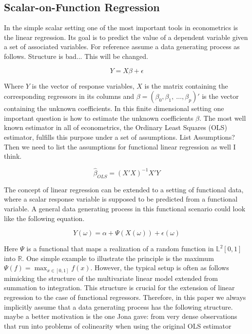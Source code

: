 \documentclass[11pt,twoside,a4paper]{article}
\begin{document}
	\subsection{Scalar-on-Function Regression}
	In the simple scalar setting one of the most important tools in econometrics is the linear regression. Its goal is to predict the value of a dependent variable given a set of associated variables. For reference assume a data generating process as follows. {\color{red} Structure is bad... This will be changed.}
	
	\begin{equation}
		Y = X\beta + \epsilon
	\end{equation}
	
	Where $Y$ is the vector of response variables, $X$ is the matrix containing the corresponding regressors in its columns and $\beta = (\beta_0, \beta_1, \: \dots, \beta_p)'$ is the vector containing the unknown coefficients.
	In this finite dimensional setting one important question is how to estimate the unknown coefficients $\beta$. The most well known estimator in all of econometrics, the Ordinary Least Squares (OLS) estimator, fulfills this purpose under a set of assumptions. {\color{red}List Assumptions? Then we need to list the assumptions for functional linear regression as well I think.}
	
	\begin{equation}
		\hat{\beta}_{OLS} = (X'X)^{-1}X'Y
	\end{equation}
	
	The concept of linear regression can be extended to a setting of functional data, where a scalar response variable is supposed to be predicted from a functional variable. 
	A general data generating process in this functional scenario could look like the following equation.
	
	\begin{equation}
		Y(\omega) = \alpha + \Psi\left(X(\omega)\right) + \epsilon(\omega)
	\end{equation}
	
	Here $\Psi$ is a functional that maps a realization of a random function in $\mathbb{L}^2[0,1]$ into $\mathbb{R}$. One simple example to illustrate the principle is the maximum $\Psi(f) = \max_{x \in [0,1]}f(x)$.
	However, the typical setup is often as follows mimicking the structure of the multivariate linear model extended from summation to integration. This structure is crucial for the extension of linear regression to the case of functional regressors. Therefore, in this paper we always implicitly assume that a data generating process has the following structure. {\color{red} maybe a better motivation is the one Jona gave: from very dense observations that run into problems of colinearity when using the original OLS estimator}
	
\end{document}
